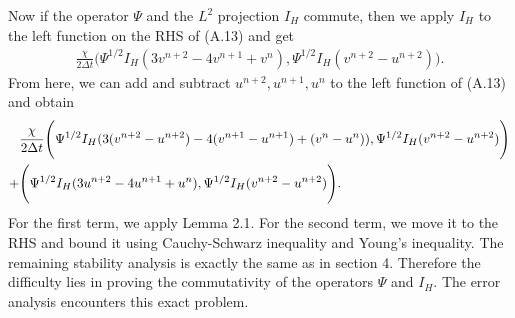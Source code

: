 \documentclass[11pt,a4paper]{article}
\begin{document}
Now if the operator $\Psi$ and the $L^2$ projection $I_H$ commute, then we apply $I_H$ to the left function on the RHS of (A.13) and get
\begin{align}
    \frac{\chi}{2\Delta t}\Bigg(\Psi^{1/2}I_H(3v^{n+2}-4v^{n+1}+v^n), \Psi^{1/2} I_H(v^{n+2}-u^{n+2})\Bigg).
\end{align}
From here, we can add and subtract $u^{n+2},u^{n+1},u^n$ to the left function of (A.13) and obtain
\begin{align}
    &\frac{\chi}{2\Delta t}\Bigg(\Psi^{1/2}I_H(3(v^{n+2}-u^{n+2})-4(v^{n+1}-u^{n+1})+(v^n-u^n)), \Psi^{1/2} I_H(v^{n+2}-u^{n+2})\Bigg) \notag \\
    +&\Bigg(\Psi^{1/2}I_H(3u^{n+2}-4u^{n+1}+u^n),\Psi^{1/2}I_H(v^{n+2}-u^{n+2})\Bigg).
\end{align}
For the first term, we apply Lemma 2.1. For the second term, we move it to the RHS and bound it using Cauchy-Schwarz inequality and Young's inequality. The remaining stability analysis is exactly the same as in section 4. Therefore the difficulty lies in proving the commutativity of the operators $\Psi$ and $I_H$. The error analysis encounters this exact problem.



\newpage




\end{document}
